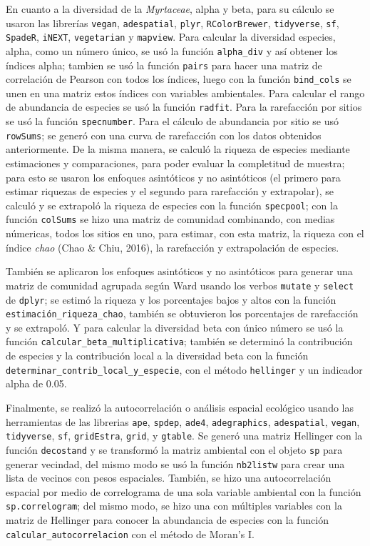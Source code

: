 \documentclass[11pt,]{article}
\begin{document}
En cuanto a la diversidad de la \emph{Myrtaceae}, alpha y beta, para su
cálculo se usaron las librerías \texttt{vegan}, \texttt{adespatial},
\texttt{plyr}, \texttt{RColorBrewer}, \texttt{tidyverse}, \texttt{sf},
\texttt{SpadeR}, \texttt{iNEXT}, \texttt{vegetarian} y \texttt{mapview}.
Para calcular la diversidad especies, alpha, como un número único, se
usó la función \texttt{alpha\_div} y así obtener los índices alpha;
tambien se usó la función \texttt{pairs} para hacer una matriz de
correlación de Pearson con todos los índices, luego con la función
\texttt{bind\_cols} se unen en una matriz estos índices con variables
ambientales. Para calcular el rango de abundancia de especies se usó la
función \texttt{radfit}. Para la rarefacción por sitios se usó la
función \texttt{specnumber}. Para el cálculo de abundancia por sitio se
usó \texttt{rowSums}; se generó con una curva de rarefacción con los
datos obtenidos anteriormente. De la misma manera, se calculó la riqueza
de especies mediante estimaciones y comparaciones, para poder evaluar la
completitud de muestra; para esto se usaron los enfoques asintóticos y
no asintóticos (el primero para estimar riquezas de especies y el
segundo para rarefacción y extrapolar), se calculó y se extrapoló la
riqueza de especies con la función \texttt{specpool}; con la función
\texttt{colSums} se hizo una matriz de comunidad combinando, con medias
númericas, todos los sitios en uno, para estimar, con esta matriz, la
riqueza con el índice \emph{chao} (Chao \& Chiu, 2016), la rarefacción y
extrapolación de especies.

También se aplicaron los enfoques asintóticos y no asintóticos para
generar una matriz de comunidad agrupada según Ward usando los verbos
\texttt{mutate} y \texttt{select} de \texttt{dplyr}; se estimó la
riqueza y los porcentajes bajos y altos con la función
\texttt{estimación\_riqueza\_chao}, también se obtuvieron los
porcentajes de rarefacción y se extrapoló. Y para calcular la diversidad
beta con único número se usó la función
\texttt{calcular\_beta\_multiplicativa}; también se determinó la
contribución de especies y la contribución local a la diversidad beta
con la función \texttt{determinar\_contrib\_local\_y\_especie}, con el
método \texttt{hellinger} y un indicador alpha de 0.05.

Finalmente, se realizó la autocorrelación o análisis espacial ecológico
usando las herramientas de las librerias \texttt{ape}, \texttt{spdep},
\texttt{ade4}, \texttt{adegraphics}, \texttt{adespatial},
\texttt{vegan}, \texttt{tidyverse}, \texttt{sf}, \texttt{gridEstra},
\texttt{grid}, y \texttt{gtable}. Se generó una matriz Hellinger con la
función \texttt{decostand} y se transformó la matriz ambiental con el
objeto \texttt{sp} para generar vecindad, del mismo modo se usó la
función \texttt{nb2listw} para crear una lista de vecinos con pesos
espaciales. También, se hizo una autocorrelación espacial por medio de
correlograma de una sola variable ambiental con la función
\texttt{sp.correlogram}; del mismo modo, se hizo una con múltiples
variables con la matriz de Hellinger para conocer la abundancia de
especies con la función \texttt{calcular\_autocorrelacion} con el método
de Moran's I.
\end{document}
